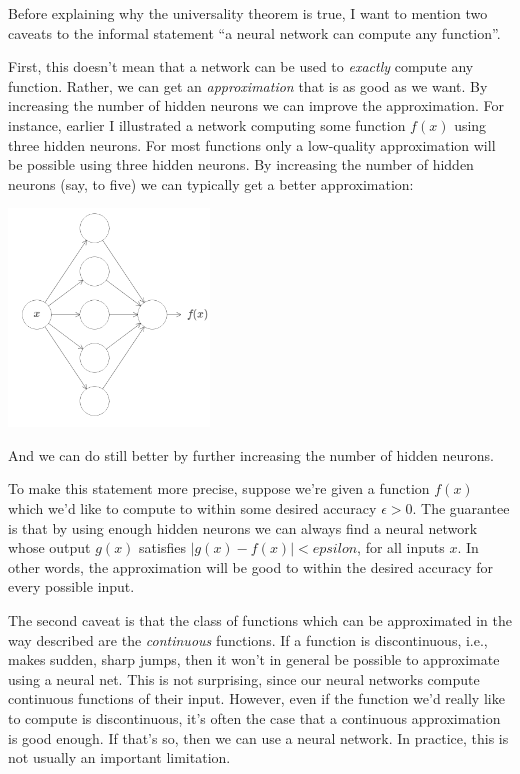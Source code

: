 Before explaining why the universality theorem is true, I want to mention two caveats to the informal statement ``a neural network can compute any function''.

First, this doesn't mean that a network can be used to \textit{exactly} compute any function. Rather, we can get an \textit{approximation} that is as good as we want. By increasing the number of hidden neurons we can improve the approximation. For instance, earlier I illustrated a network computing some function $f(x)$
using three hidden neurons. For most functions only a low-quality approximation will be possible using three hidden neurons. By increasing the number of hidden neurons (say, to five) we can typically get a better approximation:

{\centering \includegraphics[width=0.4\textwidth,]{pic/wigglyfn04.png} \par}

And we can do still better by further increasing the number of hidden neurons. 

To make this statement more precise, suppose we're given a function $f(x)$ which we'd like to compute to within some desired accuracy $\epsilon>0$. The guarantee is that by using enough hidden neurons we can always find a neural network whose output $g(x)$ satisfies $|g(x)-f(x)|<epsilon$, for all inputs $x$. In other words, the approximation will be good to within the desired accuracy for every possible input.


The second caveat is that the class of functions which can be approximated in the way described are the \textit{continuous} functions. If a function is discontinuous, i.e., makes sudden, sharp jumps, then it won't in general be possible to approximate using a neural net. This is not surprising, since our neural networks compute continuous functions of their input. However, even if the function we'd really like to compute is discontinuous, it's often the case that a continuous approximation is good enough. If that's so, then we can use a neural network. In practice, this is not usually an important limitation.

